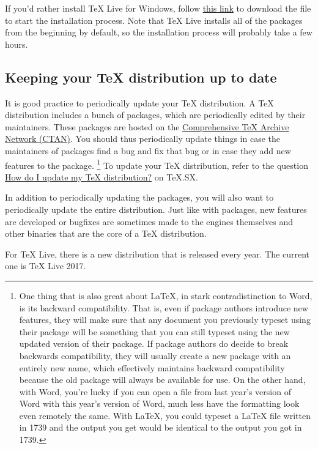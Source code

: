 If you'd rather install TeX Live for Windows, follow \href{http://www.tug.org/texlive/acquire-netinstall.html}{this link} to download the  file to start the installation process. Note that TeX Live installs all of the packages from the beginning by default, so the installation process will probably take a few hours.

\subsection{Keeping your \TeX{} distribution up to date}
\label{subsec:keeping-your-tex-distro-up-to-date}

It is good practice to periodically update your \TeX{} distribution.
A \TeX{} distribution includes a bunch of packages, which are periodically edited by their maintainers.
These packages are hosted on the \href{http://ctan.org/}{Comprehensive \TeX{} Archive Network (CTAN)}.
You should thus periodically update things in case the maintainers of packages find a bug and fix that bug or in case they add new features to the package.%
\footnote{%
One thing that is also great about \LaTeX, in stark contradistinction to Word, is its backward compatibility.
That is, even if package authors introduce new features, they will make sure that any document you previously typeset using their package will be something that you can still typeset using the new updated version of their package.
If package authors do decide to break backwards compatibility, they will usually create a new package with an entirely new name, which effectively maintains backward compatibility because the old package will always be available for use.
On the other hand, with Word, you're lucky if you can open a file from last year's version of Word with this year's version of Word, much less have the formatting look even remotely the same.
With \LaTeX, you could typeset a \LaTeX{} file written in 1739 and the output you get would be identical to the output you got in 1739.%
}
To update your \TeX{} distribution, refer to the question \href{https://tex.stackexchange.com/q/55437/32888}{How do I update my TeX distribution?} on TeX.SX.

In addition to periodically updating the packages, you will also want to periodically update the entire distribution.
Just like with packages, new features are developed or bugfixes are sometimes made to the engines themselves and other binaries that are the core of a \TeX{} distribution.

For TeX Live, there is a new distribution that is released every year.
The current one is TeX Live 2017.

